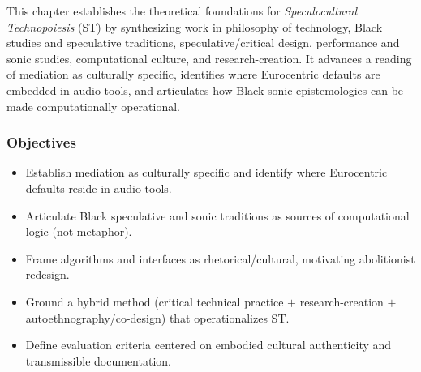 

This chapter establishes the theoretical foundations for \textit{Speculocultural Technopoiesis} (ST) by synthesizing work in philosophy of technology, Black studies and speculative traditions, speculative/critical design, performance and sonic studies, computational culture, and research-creation. It advances a reading of mediation as culturally specific, identifies where Eurocentric defaults are embedded in audio tools, and articulates how Black sonic epistemologies can be made computationally operational.

\subsubsection{Objectives}
\begin{itemize}[noitemsep]
	\item Establish mediation as culturally specific and identify where Eurocentric defaults reside in audio tools.
	\item Articulate Black speculative and sonic traditions as sources of computational logic (not metaphor).
	\item Frame algorithms and interfaces as rhetorical/cultural, motivating abolitionist redesign.
	\item Ground a hybrid method (critical technical practice $+$ research-creation $+$ autoethnography/co-design) that operationalizes ST.
	\item Define evaluation criteria centered on embodied cultural authenticity and transmissible documentation.
\end{itemize}

